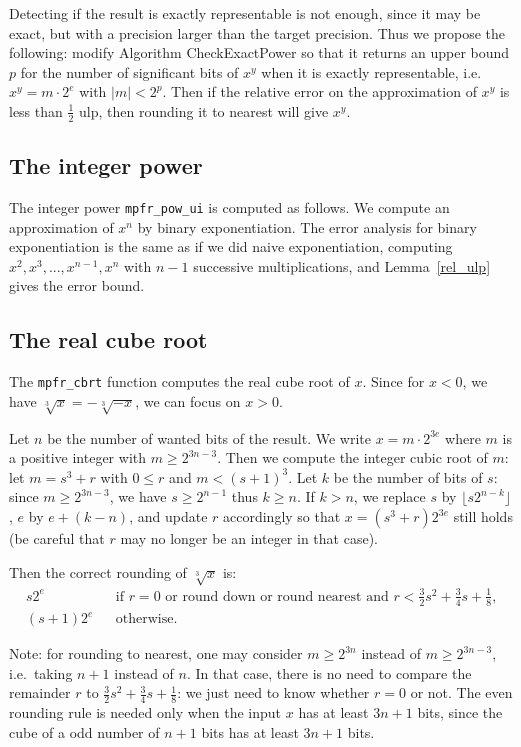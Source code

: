 \documentclass[12pt]{amsart}
\begin{document}
Detecting if the result is exactly representable is not enough, since it
may be exact, but with a precision larger than the target precision.
Thus we propose the following: modify Algorithm CheckExactPower so that
it returns an upper bound $p$ for the number of significant bits
of $x^y$ when it is exactly representable, i.e.\ $x^y = m \cdot 2^e$
with $|m| < 2^p$. Then if the relative error on the approximation of
$x^y$ is less than $\frac{1}{2}$ ulp, then rounding it to nearest will give
$x^y$.

\subsection{The integer power}

The integer power \texttt{mpfr\_pow\_ui} is computed as follows.
We compute an approximation of $x^n$ by binary exponentiation.
The error analysis for binary exponentiation is the same as if we did
naive exponentiation, computing $x^2, x^3, ..., x^{n-1}, x^n$ with $n-1$
successive multiplications, and Lemma~\ref{rel_ulp} gives the error bound.

\subsection{The real cube root}

The \texttt{mpfr\_cbrt} function computes the real cube root of $x$.
Since for $x<0$, we have $\sqrt[3]{x} = - \sqrt[3]{-x}$, we can focus
on $x > 0$.

Let $n$ be the number of wanted bits of the result.
We write $x = m \cdot 2^{3e}$ where $m$ is a positive integer
with $m \geq 2^{3n-3}$.
Then we compute the integer cubic root of $m$: let $m=s^3+r$ with
$0 \leq r$ and $m < (s+1)^3$.
Let $k$ be the number of bits of $s$: since $m \geq 2^{3n-3}$,
we have $s \geq 2^{n-1}$ thus $k \geq n$.
If $k > n$, we replace $s$ by $\lfloor s 2^{n-k} \rfloor$,
$e$ by $e+(k-n)$,
and update $r$ accordingly so that $x = (s^3+r) 2^{3e}$ still holds
(be careful that $r$ may no longer be an integer in that case).

Then the correct rounding of $\sqrt[3]{x}$ is:
\begin{eqnarray*}
s 2^e && \mbox{if $r=0$ or round down or round nearest and
        $r < \frac{3}{2} s^2 +\frac{3}{4}s+ \frac{1}{8}$,} \\
(s+1) 2^e && \mbox{otherwise}.
\end{eqnarray*}

Note: for rounding to nearest, one may consider $m \geq 2^{3n}$ instead of
$m \geq 2^{3n-3}$, i.e.\ taking $n+1$ instead of $n$.
In that case, there is no need to compare the remainder $r$ to
$\frac{3}{2} s^2 +\frac{3}{4}s+ \frac{1}{8}$: we just need to know
whether $r=0$ or not.
The even rounding rule is needed only when the input $x$ has at least
$3n+1$ bits, since the cube of a odd number of $n+1$ bits has at least
$3n+1$ bits.
\end{document}
